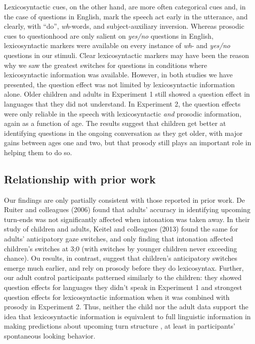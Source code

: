 \documentclass[authoryear, 12pt]{elsarticle}
\begin{document}
Lexicosyntactic cues, on the other hand, are more often categorical cues and, in the case of questions in English, mark the speech act early in the utterance, and clearly, with ``do'', \textit{wh}-words, and subject-auxiliary inversion. Whereas prosodic cues to questionhood are only salient on \textit{yes/no} questions in English, lexicosyntactic markers were available on every instance of \textit{wh}- and \textit{yes/no} questions in our stimuli. Clear lexicosyntactic markers may have been the reason why we saw the greatest switches for questions in conditions where lexicosyntactic information was available. However, in both studies we have presented, the question effect was not limited by lexicosyntactic information alone. Older children and adults in Experiment 1 still showed a question effect in languages that they did not understand. In Experiment 2, the question effects were only reliable in the speech with lexicosyntactic \textit{and} prosodic information, again as a function of age. The results suggest that children get better at identifying questions in the ongoing conversation as they get older, with major gains between ages one and two, but that prosody still plays an important role in helping them to do so.

\subsection{Relationship with prior work}

Our findings are only partially consistent with those reported in prior work. De Ruiter and colleagues (2006) found that adults' accuracy in identifying upcoming turn-ends was not significantly affected when intonation was taken away. In their study of children and adults, Keitel and colleagues (2013) found the same for adults' anticipatory gaze switches, and only finding that intonation affected children's switches at 3;0 (with switches by younger children never exceeding chance). Ou results, in contrast, suggest that children's anticipatory switches emerge much earlier, and rely on prosody before they do lexicosyntax. Further, our adult control participants patterned similarly to the children: they showed question effects for languages they didn't speak in Experiment 1 and strongest question effects for lexicosyntactic information when it was combined with prosody in Experiment 2. Thus, neither the child nor the adult data support the idea that lexicosyntactic information is equivalent to full linguistic information in making predictions about upcoming turn structure \citep{de-ruiter2006}, at least in participants' spontaneous looking behavior.
\end{document}
